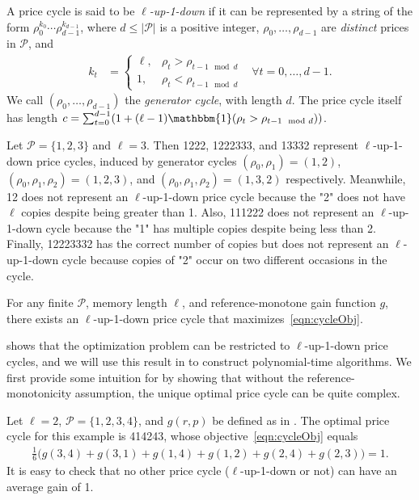 \documentclass[format=acmsmall, review=false]{acmart}
\newcommand{\bI}{\mathbbm{1}}
\newcommand{\cP}{\mathcal{P}}
\newcommand{\luid}{$\ell$-up-1-down\xspace}
\begin{document}
\begin{definition} \label{def:luid}
A price cycle is said to be \textit{\luid} if it can be represented by a string of the form $\rho_0^{k_0}\cdots\rho_{d-1}^{k_{d-1}}$, where $d\le|\cP|$ is a positive integer, $\rho_0,\ldots,\rho_{d-1}$ are \textit{distinct} prices in $\cP$, and
\begin{align*}
k_t &=
\begin{cases}
\ell, &\rho_t>\rho_{t-1\mod d} \\
1, &\rho_t<\rho_{t-1\mod d}
\end{cases}
&\forall t=0,\ldots,d-1.
\end{align*}
We call $(\rho_0,\ldots,\rho_{d-1})$ the \textit{generator cycle}, with length $d$.
The price cycle itself has length $c=\sum_{t=0}^{d-1}(1+(\ell-1)\bI(\rho_t>\rho_{t-1\mod d}))$.
\end{definition}

\begin{example}[Examples of \luid Price Cycles]
Let $\cP=\{1,2,3\}$ and $\ell=3$.  Then 1222, 1222333, and 13332 represent \luid price cycles, induced by generator cycles $(\rho_0,\rho_1)=(1,2)$, $(\rho_0,\rho_1,\rho_2)=(1,2,3)$, and $(\rho_0,\rho_1,\rho_2)=(1,3,2)$ respectively.
Meanwhile, 12 does not represent an \luid price cycle because the "2" does not have $\ell$ copies despite being greater than 1.
Also, 111222 does not represent an \luid cycle because the "1" has multiple copies despite being less than 2.
Finally, 12223332 has the correct number of copies but does not represent an \luid cycle because copies of "2" occur on two different occasions in the cycle.
\end{example}

\begin{theorem} \label{thm:theoryMain}
For any finite $\cP$, memory length $\ell$, and reference-monotone gain function $g$, there exists an \luid price cycle that maximizes~\eqref{eqn:cycleObj}.
\end{theorem}

 shows that the optimization problem can be restricted to \luid price cycles, and we will use this result in  to construct polynomial-time algorithms.  We first provide some intuition for  by showing that without the reference-monotonicity assumption, the unique optimal price cycle can be quite complex.

\begin{example} \label{ex:withoutRefMon}
Let $\ell=2$, $\cP=\{1,2,3,4\}$, and $g(r,p)$ be defined as in .  The optimal price cycle for this example is 414243, whose objective~\eqref{eqn:cycleObj} equals
\begin{align*}
\frac16 \big(g(3,4)+g(3,1)+g(1,4)+g(1,2)+g(2,4)+g(2,3)\big)=1.
\end{align*}
It is easy to check that no other price cycle (\luid or not) can have an average gain of 1.
\end{example}
\end{document}
